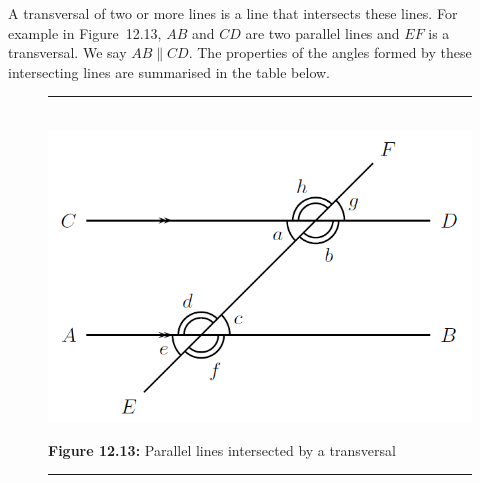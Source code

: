 A transversal of two or more lines is a line that intersects these lines. For
example in Figure~12.13, $AB$ and $CD$ are two parallel lines and $EF$ is a
transversal. We say $AB\parallel CD$. The properties of the angles formed by
these intersecting lines are summarised in the table below.\par 
\setcounter{subfigure}{0}
\begin{figure}[H] %
\begin{center}
\rule[.1in]{\figurerulewidth}{.005in} \\
\label{m39370*uid29!!!underscore!!!media}\label{
m39370*uid29!!!underscore!!!printimage}\includegraphics[width=.8\columnwidth]{
col11306.imgs/m39370_MG10C13_011.png} %
\vspace{2pt}
\vspace{\rubberspace}\par \begin{cnxcaption}
\small \textbf{Figure 12.13: }Parallel lines intersected by a transversal
\end{cnxcaption}
\vspace{.1in}
\rule[.1in]{\figurerulewidth}{.005in} \\
\end{center}
\end{figure}       
